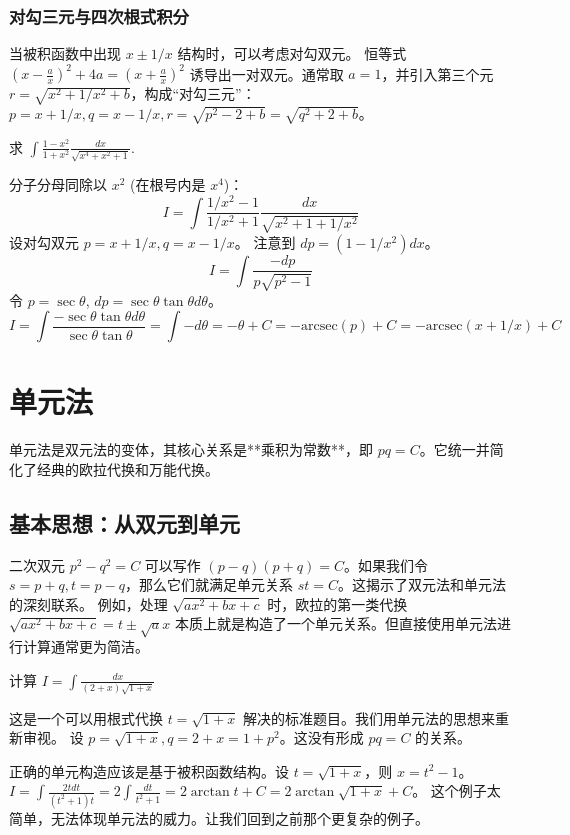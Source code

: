 \documentclass[lang=cn,newtx,10pt,scheme=chinese]{elegantbook}
\begin{document}
\subsection{对勾三元与四次根式积分}
当被积函数中出现 $x \pm 1/x$ 结构时，可以考虑对勾双元。
恒等式 $(x-\frac{a}{x})^{2}+4a=(x+\frac{a}{x})^{2}$ 诱导出一对双元。通常取 $a=1$，并引入第三个元 $r=\sqrt{x^2+1/x^2+b}$，构成“对勾三元”：
$p=x+1/x, q=x-1/x, r=\sqrt{p^2-2+b} = \sqrt{q^2+2+b}$。
\begin{problem}
求 $\int\frac{1-x^{2}}{1+x^{2}}\frac{dx}{\sqrt{x^{4}+x^{2}+1}}.$
\end{problem}
\begin{solution}
分子分母同除以 $x^2$ (在根号内是 $x^4$)：
\begin{equation*}
    I = \int \frac{1/x^2-1}{1/x^2+1} \frac{dx}{\sqrt{x^2+1+1/x^2}}
\end{equation*}
设对勾双元 $p=x+1/x, q=x-1/x$。
注意到 $dp = (1-1/x^2)dx$。
\begin{equation*}
    I = \int \frac{-dp}{p\sqrt{p^2-1}}
\end{equation*}
令 $p=\sec\theta$, $dp=\sec\theta\tan\theta d\theta$。
\begin{equation*}
    I = \int \frac{-\sec\theta\tan\theta d\theta}{\sec\theta \tan\theta} = \int -d\theta = -\theta+C = -\text{arcsec}(p)+C = -\text{arcsec}(x+1/x)+C
\end{equation*}
\end{solution}

\chapter{单元法}
单元法是双元法的变体，其核心关系是**乘积为常数**，即 $pq=C$。它统一并简化了经典的欧拉代换和万能代换。

\section{基本思想：从双元到单元}
二次双元 $p^2-q^2=C$ 可以写作 $(p-q)(p+q)=C$。如果我们令 $s=p+q, t=p-q$，那么它们就满足单元关系 $st=C$。这揭示了双元法和单元法的深刻联系。
例如，处理 $\sqrt{ax^2+bx+c}$ 时，欧拉的第一类代换 $\sqrt{ax^2+bx+c} = t \pm \sqrt{a}x$ 本质上就是构造了一个单元关系。但直接使用单元法进行计算通常更为简洁。

\begin{problem}
    计算 $I = \int \frac{dx}{(2+x)\sqrt{1+x}}$
\end{problem}
\begin{solution}
    这是一个可以用根式代换 $t=\sqrt{1+x}$ 解决的标准题目。我们用单元法的思想来重新审视。
    设 $p = \sqrt{1+x}, q = 2+x = 1+p^2$。这没有形成 $pq=C$ 的关系。
    
    正确的单元构造应该是基于被积函数结构。设 $t = \sqrt{1+x}$，则 $x=t^2-1$。
    $I = \int \frac{2t dt}{(t^2+1)t} = 2 \int \frac{dt}{t^2+1} = 2 \arctan t + C = 2\arctan\sqrt{1+x}+C$。
    这个例子太简单，无法体现单元法的威力。让我们回到之前那个更复杂的例子。
\end{solution}
\end{document}
